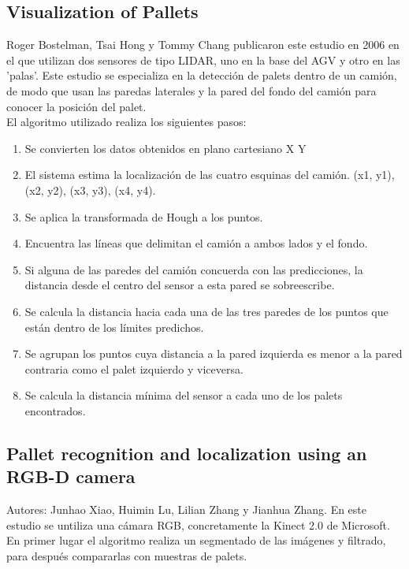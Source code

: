 \subsection{Visualization of Pallets \cite{article13:visualizationpallets}}
Roger Bostelman, Tsai Hong y Tommy Chang publicaron este estudio en 2006 en el que utilizan dos sensores de tipo LIDAR, uno en la base del AGV y otro en las 'palas'.
Este estudio se especializa en la detección de palets dentro de un camión, de modo que usan las paredas laterales y la pared del fondo del camión para conocer la posición del palet.\\
El algoritmo utilizado realiza los siguientes pasos:
\begin{enumerate}
\item Se convierten los datos obtenidos en plano cartesiano X Y
\item El sistema estima la localización de las cuatro esquinas del camión. (x1, y1), (x2, y2), (x3, y3), (x4, y4).
\item Se aplica la transformada de Hough a los puntos.
\item Encuentra las líneas que delimitan el camión a ambos lados y el fondo.
\item Si alguna de las paredes del camión concuerda con las predicciones, la distancia desde el centro del sensor a esta pared se sobreescribe.
\item Se calcula la distancia hacia cada una de las tres paredes de los puntos que están dentro de los límites predichos.
\item Se agrupan los puntos cuya distancia a la pared izquierda es menor a la pared contraria como el palet izquierdo y viceversa.
\item Se calcula la distancia mínima del sensor a cada uno de los palets encontrados.
\end{enumerate}

 \subsection{Pallet recognition and localization using an RGB-D camera \cite{art16:rgbdcamera}}
Autores: Junhao Xiao, Huimin Lu, Lilian Zhang y Jianhua Zhang.
En este estudio se untiliza una cámara RGB, concretamente la Kinect 2.0 de Microsoft.
En primer lugar el algoritmo realiza un segmentado de las imágenes y filtrado, para después compararlas con muestras de palets.

